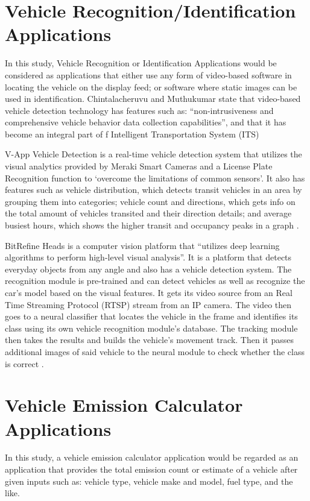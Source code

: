 \section{Vehicle Recognition/Identification Applications}
	
	In this study, Vehicle Recognition or Identification Applications would be considered as applications that either use any form of video-based software in locating the vehicle on the display feed; or software where static images can be used in identification. Chintalacheruvu and Muthukumar \citeyear{chintalacheruvu_2012} state that video-based vehicle detection technology has features such as: “non-intrusiveness and comprehensive vehicle behavior data collection capabilities”, and that it has become an integral part of f Intelligent Transportation System (ITS)

	V-App Vehicle Detection is a real-time vehicle detection system that utilizes the visual analytics provided by Meraki Smart Cameras and a License Plate Recognition function to ‘overcome the limitations of common sensors’. It also has features such as vehicle distribution, which detects transit vehicles in an area by grouping them into categories; vehicle count and directions, which gets info on the total amount of vehicles transited and their direction details; and average busiest hours, which shows the higher transit and occupancy peaks in a graph \cite{VAPP_ND}.

	BitRefine Heads is a computer vision platform that “utilizes deep learning algorithms to perform high-level visual analysis”. It is a platform that detects everyday objects from any angle and also has a vehicle detection system. The recognition module is pre-trained and can detect vehicles as well as recognize the car’s model based on the visual features. It gets its video source from an Real Time Streaming Protocol (RTSP) stream from an IP camera. The video then goes to a neural classifier that locates the vehicle in the frame and identifies its class using its own vehicle recognition module’s database.  The tracking module then takes the results and builds the vehicle’s movement track. Then it passes additional images of said vehicle to the neural module to check whether the class is correct \cite{BITREFINE_ND}.


\section{Vehicle Emission Calculator Applications}
	In this study, a vehicle emission calculator application would be regarded as an application that provides the total emission count or estimate of a vehicle after given inputs such as: vehicle type, vehicle make and model, fuel type, and the like.
	
